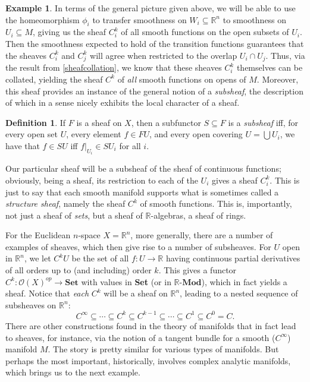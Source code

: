 \documentclass[11pt]{book}
\theoremstyle{definition}
\newtheorem{example}{Example}[section]
\theoremstyle{definition}
\newtheorem{definition}{Definition}[section]
\theoremstyle{definition}
\theoremstyle{theorem}
\theoremstyle{definition}
\begin{document}
\begin{example}
	In terms of the general picture given above, we will be able to use the homeomorphism $\phi_i$ to transfer smoothness on $W_i \subseteq \mathbb{R}^n$ to smoothness on $U_i \subseteq M$, giving us the sheaf $C_i^k$ of all smooth functions on the open subsets of $U_i$. Then the smoothness expected to hold of the transition functions guarantees that the sheaves $C^k_i$ and $C^k_j$ will agree when restricted to the overlap $U_i \cap U_j$. Thus, via the result from \ref{sheafcollation}, we know that these sheaves $C^k_i$ themselves can be collated, yielding the sheaf $C^k$ of \textit{all} smooth functions on opens of $M$. Moreover, this sheaf provides an instance of the general notion of a \textit{subsheaf}, the description of which in a sense nicely exhibits the local character of a sheaf.   
	\begin{definition}
		If $F$ is a sheaf on $X$, then a subfunctor $S \subseteq F$ is a \textit{subsheaf} iff, for every open set $U$, every element $f \in FU$, and every open covering $U = \bigcup U_i$, we have that $f \in SU$ iff $f|_{U_i} \in SU_i$ for all $i$.
	\end{definition} \noindent 
Our particular sheaf will be a subsheaf of the sheaf of continuous functions; obviously, being a sheaf, its restriction to each of the $U_i$ gives a sheaf $C^k_i$. This is just to say that each smooth manifold supports what is sometimes called a \textit{structure sheaf}, namely the sheaf $C^k$ of smooth functions. This is, importantly, not just a sheaf of \textit{sets}, but a sheaf of $\mathbb{R}$-algebras, a sheaf of rings. \par 
For the Euclidean $n$-space $X = \mathbb{R}^n$, more generally, there are a number of examples of sheaves, which then give rise to a number of subsheaves. For $U$ open in $\mathbb{R}^n$, we let $C^k U$ be the set of all $f: U \rightarrow \mathbb{R}$ having continuous partial derivatives of all orders up to (and including) order $k$. This gives a functor $C^k : \mathscr{O}(X)^{op} \rightarrow \textbf{Set}$ with values in \textbf{Set} (or in $\mathbb{R}$-$\textbf{Mod}$), which in fact yields a sheaf. Notice that \textit{each} $C^k$ will be a sheaf on $\mathbb{R}^n$, leading to a nested sequence of subsheaves on $\mathbb{R}^n$: 
		\begin{equation*}
		C^{\infty} \subseteq \cdots \subseteq C^k \subseteq C^{k-1} \subseteq \cdots \subseteq C^1 \subseteq C^0 = C.
		\end{equation*}
There are other constructions found in the theory of manifolds that in fact lead to sheaves, for instance, via the notion of a tangent bundle for a smooth ($C^{\infty}$) manifold $M$. The story is pretty similar for various types of manifolds. But perhaps the most important, historically, involves complex analytic manifolds, which brings us to the next example.
\end{example}
\end{document}
